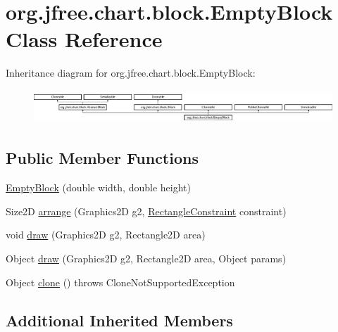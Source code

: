 \hypertarget{classorg_1_1jfree_1_1chart_1_1block_1_1_empty_block}{}\section{org.\+jfree.\+chart.\+block.\+Empty\+Block Class Reference}
\label{classorg_1_1jfree_1_1chart_1_1block_1_1_empty_block}
Inheritance diagram for org.\+jfree.\+chart.\+block.\+Empty\+Block\+:\begin{figure}[H]
\begin{center}
\leavevmode
\includegraphics[height=1.284404cm]{classorg_1_1jfree_1_1chart_1_1block_1_1_empty_block}
\end{center}
\end{figure}
\subsection*{Public Member Functions}
\begin{DoxyCompactItemize}
\item 
\mbox{\hyperlink{classorg_1_1jfree_1_1chart_1_1block_1_1_empty_block_a113366bb66c37cd5600b0a6550861e65}{Empty\+Block}} (double width, double height)
\item 
Size2D \mbox{\hyperlink{classorg_1_1jfree_1_1chart_1_1block_1_1_empty_block_adf2baca7ef56fa857a0874f08e029a74}{arrange}} (Graphics2D g2, \mbox{\hyperlink{classorg_1_1jfree_1_1chart_1_1block_1_1_rectangle_constraint}{Rectangle\+Constraint}} constraint)
\item 
void \mbox{\hyperlink{classorg_1_1jfree_1_1chart_1_1block_1_1_empty_block_aaf87837a66c602c1b5c0e8af743932a0}{draw}} (Graphics2D g2, Rectangle2D area)
\item 
Object \mbox{\hyperlink{classorg_1_1jfree_1_1chart_1_1block_1_1_empty_block_a0b6a2e4523859ae8787ad8ca0221ec47}{draw}} (Graphics2D g2, Rectangle2D area, Object params)
\item 
Object \mbox{\hyperlink{classorg_1_1jfree_1_1chart_1_1block_1_1_empty_block_a7bf3174e161f7106018c04fdee1e384d}{clone}} ()  throws Clone\+Not\+Supported\+Exception 
\end{DoxyCompactItemize}
\subsection*{Additional Inherited Members}


